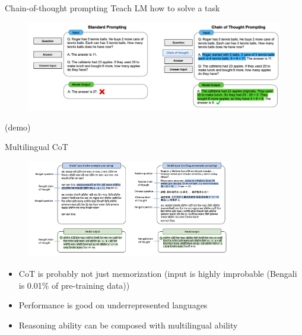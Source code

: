 \documentclass[usenames,dvipsnames,notes,11pt,aspectratio=169,hyperref={colorlinks=true, linkcolor=blue}]{beamer}
\newcommand{\pdfnote}[1]{}
\begin{document}
\begin{frame}
    {Chain-of-thought prompting}{}
    Teach LM how to solve a task    
    \begin{figure}
        \includegraphics[width=\textwidth]{figures/cot}
    \end{figure}

    (demo)
    \pdfnote{
        Input: John Doe
Output: The first letter of each word is J and D, therefore the answer is JD

Input: Sandra Smith
Output: The first letter of each word is S and S, therefore the answer is SS

Input: Tim Lee
Output: The first letter of each word is T and L, therefore the answer is TL

Input: Abi Wang
Output:  The first letter of each word is A and W
    }
    \pdfnote{
        simpler CoT: e.g., A and W -> WA
    }
    \pdfnote{
        wrong CoT: e.g., first -> last 
    }
\end{frame}

\begin{frame}
    {Multilingual CoT}

    \begin{figure}
        \includegraphics[width=0.8\textwidth]{figures/multiling-cot}
    \end{figure}

    \begin{itemize}
        \item CoT is probably not just memorization (input is highly improbable (Bengali is 0.01\% of pre-training data))
        \item Performance is good on underrepresented languages
        \item Reasoning ability can be composed with multilingual ability
    \end{itemize}
\end{frame}
\end{document}

